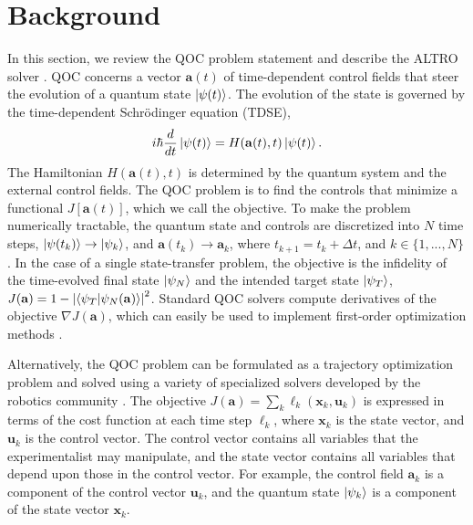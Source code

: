 \section{Background \label{sec:background}}
In this section, we
review the QOC problem statement
and describe the ALTRO solver \cite{howell2019altro}.
QOC concerns a vector $\mathbf{a}(t)$ of time-dependent control fields
that steer the evolution of a quantum state $\ket{\psi(t)}$.
The evolution of the state is governed by the time-dependent
Schr{\"o}dinger equation (TDSE),
\begin{equation}
  i \hbar \frac{d}{dt} \ket{\psi(t)} = H(\mathbf{a}(t), t) \ket{\psi(t)}.
  \label{eq:tdse}
\end{equation}
The Hamiltonian $H(\mathbf{a}(t), t)$ is determined by the quantum system
and the external control fields.
The QOC problem is to find the
controls that minimize a functional $J[\mathbf{a}(t)]$,
which we call the objective.
To make the problem numerically tractable,
the quantum state and controls are discretized into $N$ time steps,
$\ket{\psi(t_{k})} \to \ket{\psi_{k}}$,
and $\mathbf{a}(t_{k})\to \mathbf{a}_{k}$, where $t_{k + 1} = t_{k} + \Delta t$,
and $k \in \{1, ..., N\}$.
In the case of a single state-transfer problem, the objective is
the infidelity of the time-evolved final state $\ket{\psi_{N}}$ and
the intended target state $\ket{\psi_{T}}$,
$J(\mathbf{a}) = 1 - {\lvert \braket{\psi_{T}}{\psi_{N}(\mathbf{a})} \rvert}^{2}$.
Standard QOC solvers compute derivatives of the objective $\nabla J(\mathbf{a})$,
which can easily be used to implement first-order optimization methods
\cite{machnes2015tunable, khaneja2005optimal, leung2017speedup, goerz2019krotov}.

Alternatively, the QOC problem can be formulated as a trajectory optimization problem 
and solved using a variety of specialized solvers developed by the robotics community
\cite{Schulman13, Tedrake16, Hereid2017FROST, howell2019altro}.
The objective $J(\mathbf{a})=\sum_k \ell_{k}(\mathbf{x}_{k}, \mathbf{u}_{k})$ is expressed in terms of the cost function
at each time step $\ell_k$, where
$\mathbf{x}_{k}$ is the state vector,
and $\mathbf{u}_{k}$ is the control vector.
The control vector contains all variables that the experimentalist
may manipulate, and the state vector contains all variables that
depend upon those in the control vector.
For example, the control field 
$\mathbf{a}_{k}$ is a component of the control vector $\mathbf{u}_{k}$,
and the quantum state $\ket{\psi_{k}}$ is a component of
the state vector $\mathbf{x}_{k}$.


